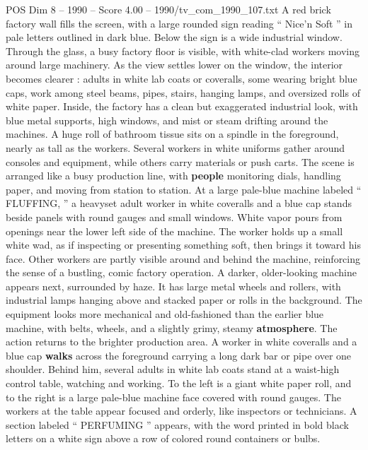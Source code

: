 \begin{textsample}{POS Dim 8 – 1990 – Score 4.00 – 1990/tv\_com\_1990\_107.txt}  \label{ex:f8_pos_067}
A red brick factory wall fills the screen, with a large rounded sign reading “ Nice’n Soft ” in pale letters outlined in dark blue.
Below the sign is a wide industrial window.
Through the glass, a busy factory floor is visible, with white-clad workers moving around large machinery.
As the view settles lower on the window, the interior becomes clearer : adults in white lab coats or coveralls, some wearing bright blue caps, work among steel beams, pipes, stairs, hanging lamps, and oversized rolls of white paper.
Inside, the factory has a clean but exaggerated industrial look, with blue metal supports, high windows, and mist or steam drifting around the machines.
A huge roll of bathroom tissue sits on a spindle in the foreground, nearly as tall as the workers.
Several workers in white uniforms gather around consoles and equipment, while others carry materials or push carts.
The scene is arranged like a busy production line, with \textbf{people} monitoring dials, handling paper, and moving from station to station.
At a large pale-blue machine labeled “ FLUFFING, ” a heavyset adult worker in white coveralls and a blue cap stands beside panels with round gauges and small windows.
White vapor pours from openings near the lower left side of the machine.
The worker holds up a small white wad, as if inspecting or presenting something soft, then brings it toward his face.
Other workers are partly visible around and behind the machine, reinforcing the sense of a bustling, comic factory operation.
A darker, older-looking machine appears next, surrounded by haze.
It has large metal wheels and rollers, with industrial lamps hanging above and stacked paper or rolls in the background.
The equipment looks more mechanical and old-fashioned than the earlier blue machine, with belts, wheels, and a slightly grimy, steamy \textbf{atmosphere}.
The action returns to the brighter production area.
A worker in white coveralls and a blue cap \textbf{walks} across the foreground carrying a long dark bar or pipe over one shoulder.
Behind him, several adults in white lab coats stand at a waist-high control table, watching and working.
To the left is a giant white paper roll, and to the right is a large pale-blue machine face covered with round gauges.
The workers at the table appear focused and orderly, like inspectors or technicians.
A section labeled “ PERFUMING ” appears, with the word printed in bold black letters on a white sign above a row of colored round containers or bulbs.

\end{textsample}

